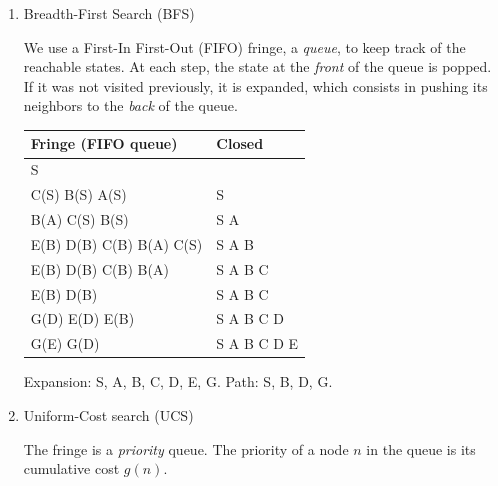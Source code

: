 \documentclass[11pt, a4paper]{article}
\begin{document}
\begin{enumerate}
    \item Breadth-First Search (BFS)

    \begin{solution}
        We use a First-In First-Out (FIFO) fringe, \ie{} a \emph{queue}, to keep track of the reachable states. At each step, the state at the \emph{front} of the queue is popped. If it was not visited previously, it is expanded, which consists in pushing its neighbors to the \emph{back} of the queue.

        \begin{table}[h]
            \centering
            \begin{tabular}{l|l}
                \toprule
                Fringe (FIFO queue) & Closed \\
                \midrule
                S & \\
                C(S) B(S) A(S) & S \\
                B(A) C(S) B(S) & S A \\
                E(B) D(B) C(B) B(A) C(S) & S A B \\
                E(B) D(B) C(B) B(A) & S A B C \\
                E(B) D(B) & S A B C \\
                G(D) E(D) E(B) & S A B C D \\
                G(E) G(D) & S A B C D E \\
                \bottomrule
            \end{tabular}
        \end{table}

        Expansion: S, A, B, C, D, E, G. Path: S, B, D, G.
    \end{solution}

    \begin{solution}
        \newpage
    \end{solution}

    \item Uniform-Cost search (UCS)

    \begin{solution}
        The fringe is a \emph{priority} queue. The priority of a node $n$ in the queue is its cumulative cost $g(n)$.


\end{solution}
\end{enumerate}
\end{document}
